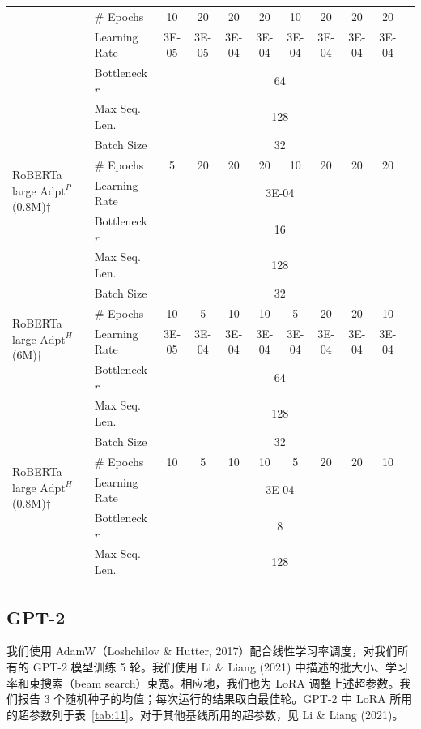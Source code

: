 \documentclass[11pt,UTF8,fontset=fandol]{ctexart}
\begin{document}
\begin{table}[H]
\begin{tabular}{llccccccccc}
 & \# Epochs & 10 & 20 & 20 & 20 & 10 & 20 & 20 & 20 \\
 & Learning Rate & 3E-05 & 3E-05 & 3E-04 & 3E-04 & 3E-04 & 3E-04 & 3E-04 & 3E-04 \\
 & Bottleneck $r$ & \multicolumn{8}{c}{64} \\
 & Max Seq. Len. & \multicolumn{8}{c}{128} \\
\midrule
\multirow{4}{*}{RoBERTa large $\text{Adpt}^P$(0.8M)$\dagger$}
 & Batch Size & \multicolumn{8}{c}{32} \\
 & \# Epochs & 5 & 20 & 20 & 20 & 10 & 20 & 20 & 20 \\
 & Learning Rate & \multicolumn{8}{c}{3E-04} \\
 & Bottleneck $r$ & \multicolumn{8}{c}{16} \\
 & Max Seq. Len. & \multicolumn{8}{c}{128} \\
\midrule
\multirow{4}{*}{RoBERTa large $\text{Adpt}^H$(6M)$\dagger$}
 & Batch Size & \multicolumn{8}{c}{32} \\
 & \# Epochs & 10 & 5 & 10 & 10 & 5 & 20 & 20 & 10 \\
 & Learning Rate & 3E-05 & 3E-04 & 3E-04 & 3E-04 & 3E-04 & 3E-04 & 3E-04 & 3E-04 \\
 & Bottleneck $r$ & \multicolumn{8}{c}{64} \\
 & Max Seq. Len. & \multicolumn{8}{c}{128} \\
\midrule
\multirow{4}{*}{RoBERTa large $\text{Adpt}^H$(0.8M)$\dagger$}
 & Batch Size & \multicolumn{8}{c}{32} \\
 & \# Epochs & 10 & 5 & 10 & 10 & 5 & 20 & 20 & 10 \\
 & Learning Rate & \multicolumn{8}{c}{3E-04} \\
 & Bottleneck $r$ & \multicolumn{8}{c}{8} \\
 & Max Seq. Len. & \multicolumn{8}{c}{128} \\
\bottomrule
\end{tabular}
\end{table}

\subsection{GPT-2}

我们使用 AdamW（Loshchilov \& Hutter, 2017）配合线性学习率调度，对我们所有的 GPT-2 模型训练 5 轮。我们使用 Li \& Liang (2021) 中描述的批大小、学习率和束搜索（beam search）束宽。相应地，我们也为 LoRA 调整上述超参数。我们报告 3 个随机种子的均值；每次运行的结果取自最佳轮。GPT-2 中 LoRA 所用的超参数列于表~\ref{tab:11}。对于其他基线所用的超参数，见 Li \& Liang (2021)。
\end{document}
